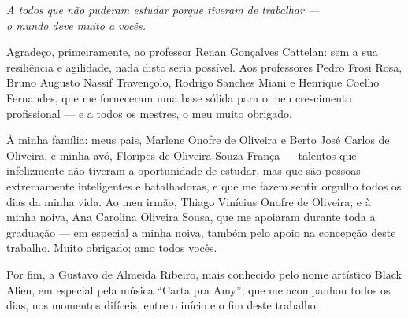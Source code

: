 \documentclass[12pt, %
openright, 
oneside,
a4paper,
english,   %
brazil]{facom-ufu-abntex2}
\begin{document}
\frenchspacing

\imprimircapa
\imprimirfolhaderosto


%
%

\begin{dedicatoria}
   \vspace*{\fill}
   \centering
   \noindent
   \textit{A todos que não puderam estudar porque tiveram de trabalhar ---\\
   o mundo deve muito a vocês.}
   \vspace*{\fill}
\end{dedicatoria}

\begin{agradecimentos}
Agradeço, primeiramente, ao professor Renan Gonçalves Cattelan: sem a sua
resiliência e agilidade, nada disto seria possível. Aos professores Pedro
Frosi Rosa, Bruno Augusto Nassif Travençolo, Rodrigo Sanches Miani e Henrique
Coelho Fernandes, que me forneceram uma base sólida para o meu crescimento
profissional --- e a todos os mestres, o meu muito obrigado.

À minha família: meus pais, Marlene Onofre de Oliveira e Berto José Carlos
de Oliveira, e minha avó, Floripes de Oliveira Souza França --- talentos que
infelizmente não tiveram a oportunidade de estudar, mas que são pessoas
extremamente inteligentes e batalhadoras, e que me fazem sentir orgulho
todos os dias da minha vida. Ao meu irmão, Thiago Vinícius Onofre de
Oliveira, e à minha noiva, Ana Carolina Oliveira Sousa, que me apoiaram
durante toda a graduação --- em especial a minha noiva, também pelo apoio na
concepção deste trabalho. Muito obrigado; amo todos vocês.

Por fim, a Gustavo de Almeida Ribeiro, mais conhecido pelo nome artístico
Black Alien, em especial pela música ``Carta pra Amy'', que me acompanhou
todos os dias, nos momentos difíceis, entre o início e o fim deste trabalho.
\end{agradecimentos}
\end{document}
